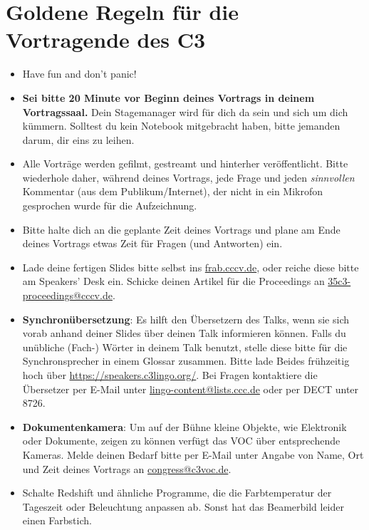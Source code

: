 \documentclass[paper=a4]{scrartcl}
\begin{document}
\section*{Goldene Regeln für die Vortragende des C3}
\begin{itemize}
	\item Have fun and don't panic!
	\item \textbf{Sei bitte 20 Minute vor Beginn deines Vortrags in deinem Vortragssaal.} Dein Stagemanager wird für dich da sein und sich um dich kümmern. Solltest du kein Notebook mitgebracht haben, bitte jemanden darum, dir eins zu leihen.
	\item Alle Vorträge werden gefilmt, gestreamt und hinterher veröffentlicht. Bitte wiederhole daher, während deines Vortrags, jede Frage und jeden \textit{sinnvollen} Kommentar (aus dem Publikum/Internet), der nicht in ein Mikrofon gesprochen wurde für die Aufzeichnung.
	\item Bitte halte dich an die geplante Zeit deines Vortrags und plane am Ende deines Vortrags etwas Zeit für Fragen (und Antworten) ein.
	\item Lade deine fertigen Slides bitte selbst ins \url{frab.cccv.de}, oder reiche diese bitte am Speakers' Desk ein. Schicke deinen Artikel für die Proceedings an \url{35c3-proceedings@cccv.de}.
	\item \textbf{Synchronübersetzung}: Es hilft den Übersetzern des Talks, wenn sie sich vorab anhand deiner Slides über deinen Talk informieren können. Falls du unübliche (Fach-\nobreak) Wörter in deinem Talk benutzt, stelle diese bitte für die Synchronsprecher in einem Glossar zusammen. Bitte lade Beides frühzeitig hoch über \url{https://speakers.c3lingo.org/}. Bei Fragen kontaktiere die Übersetzer per E-Mail unter \url{lingo-content@lists.ccc.de} oder per DECT unter 8726.
	\item \textbf{Dokumentenkamera}: Um auf der Bühne kleine Objekte, wie Elektronik oder Dokumente, zeigen zu können verfügt das VOC über entsprechende Kameras. Melde deinen Bedarf bitte per E-Mail unter Angabe von Name, Ort und Zeit deines Vortrags an \url{congress@c3voc.de}.
	\item Schalte Redshift und ähnliche Programme, die die Farbtemperatur der Tageszeit oder Beleuchtung anpassen ab. Sonst hat das Beamerbild leider einen Farbstich.
\end{itemize}
\end{document}
